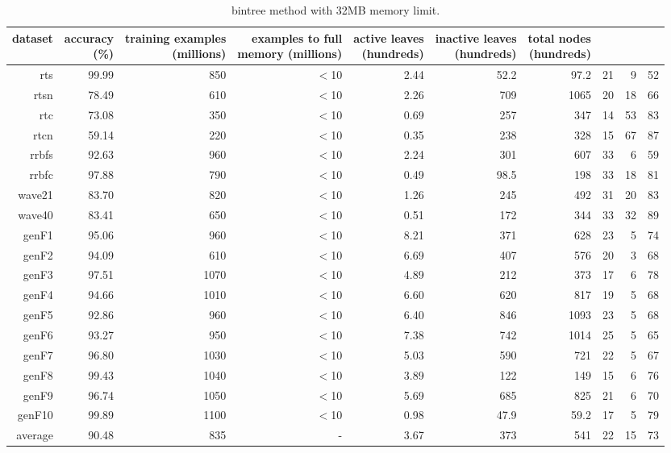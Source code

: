 \clearpage
\begin{table}
\caption{{\sc bintree} method with 32MB memory limit.}
\label{tab:bintree-32MB}
\centering
\begin{tabular}{|r|r|r|r|r|r|r|r|r|r|}
\hline
dataset	&
\rotatebox{90}{\parbox{9em}{accuracy\\(\%)}} &
\rotatebox{90}{\parbox{9em}{training examples\\(millions)}} &
\rotatebox{90}{\parbox{9em}{examples to full\\memory (millions)}} &
\rotatebox{90}{\parbox{9em}{active leaves\\(hundreds)}} &
\rotatebox{90}{\parbox{9em}{inactive leaves\\(hundreds)}} &
\rotatebox{90}{\parbox{9em}{total nodes\\(hundreds)}} &
\rotatebox{90}{\parbox{9em}{tree depth}}	&
\rotatebox{90}{\parbox{9em}{training speed (\%)}} &
\rotatebox{90}{\parbox{9em}{prediction speed (\%)}} \\
\hline
{\sc rts} & 99.99 & 850 & $<$10 & 2.44 & 52.2 & 97.2 & 21 & 9 & 52 \\
{\sc rtsn} & 78.49 & 610 & $<$10 & 2.26 & 709 & 1065 & 20 & 18 & 66 \\
{\sc rtc} & 73.08 & 350 & $<$10 & 0.69 & 257 & 347 & 14 & 53 & 83 \\
{\sc rtcn} & 59.14 & 220 & $<$10 & 0.35 & 238 & 328 & 15 & 67 & 87 \\
{\sc rrbfs} & 92.63 & 960 & $<$10 & 2.24 & 301 & 607 & 33 & 6 & 59 \\
{\sc rrbfc} & 97.88 & 790 & $<$10 & 0.49 & 98.5 & 198 & 33 & 18 & 81 \\
{\sc wave21} & 83.70 & 820 & $<$10 & 1.26 & 245 & 492 & 31 & 20 & 83 \\
{\sc wave40} & 83.41 & 650 & $<$10 & 0.51 & 172 & 344 & 33 & 32 & 89 \\
{\sc genF1} & 95.06 & 960 & $<$10 & 8.21 & 371 & 628 & 23 & 5 & 74 \\
{\sc genF2} & 94.09 & 610 & $<$10 & 6.69 & 407 & 576 & 20 & 3 & 68 \\
{\sc genF3} & 97.51 & 1070 & $<$10 & 4.89 & 212 & 373 & 17 & 6 & 78 \\
{\sc genF4} & 94.66 & 1010 & $<$10 & 6.60 & 620 & 817 & 19 & 5 & 68 \\
{\sc genF5} & 92.86 & 960 & $<$10 & 6.40 & 846 & 1093 & 23 & 5 & 68 \\
{\sc genF6} & 93.27 & 950 & $<$10 & 7.38 & 742 & 1014 & 25 & 5 & 65 \\
{\sc genF7} & 96.80 & 1030 & $<$10 & 5.03 & 590 & 721 & 22 & 5 & 67 \\
{\sc genF8} & 99.43 & 1040 & $<$10 & 3.89 & 122 & 149 & 15 & 6 & 76 \\
{\sc genF9} & 96.74 & 1050 & $<$10 & 5.69 & 685 & 825 & 21 & 6 & 70 \\
{\sc genF10} & 99.89 & 1100 & $<$10 & 0.98 & 47.9 & 59.2 & 17 & 5 & 79 \\
\hline
average & 90.48 & 835 &  -  & 3.67 & 373 & 541 & 22 & 15 & 73 \\
\hline
\end{tabular}
\end{table}
